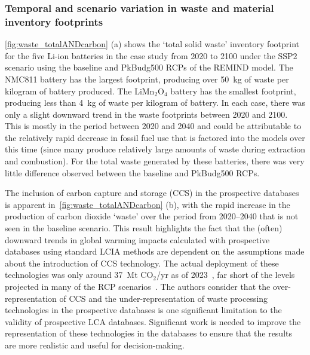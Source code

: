 \subsubsection{Temporal and scenario variation in waste and material inventory footprints}

\autoref{fig:waste_totalANDcarbon} (a) shows the `total solid waste' inventory footprint for the five Li-ion batteries in the case study from 2020 to 2100 under the SSP2 scenario using the baseline and PkBudg500 RCPs of the REMIND model. The NMC811 battery has the largest footprint, producing over 50~kg of waste per kilogram of battery produced. The  LiMn\(_2\)O\(_4\) battery has the smallest footprint, producing less than 4~kg of waste per kilogram of battery. In each case, there was only a slight downward trend in the waste footprints between 2020 and 2100. This is mostly in the period between 2020 and 2040 and could be attributable to the relatively rapid decrease in fossil fuel use that is factored into the models over this time (since many produce relatively large amounts of waste during extraction and combustion). For the total waste generated by these batteries, there was very little difference observed between the baseline and PkBudg500 RCPs.

The inclusion of carbon capture and storage (CCS) in the prospective databases is apparent in~\autoref{fig:waste_totalANDcarbon} (b), with the rapid increase in the production of carbon dioxide `waste' over the period from 2020--2040 that is not seen in the baseline scenario. This result highlights the fact that the (often) downward trends in global warming impacts calculated with prospective databases using standard LCIA methods are dependent on the assumptions made about the introduction of CCS technology. The actual deployment of these technologies was only around 37~Mt CO$_2$/yr as of 2023~\citep{dziejarski2023ccs}, far short of the levels projected in many of the RCP scenarios~\citep{sacchi2023premisedocs}. The authors consider that the over-representation of CCS and the under-representation of waste processing technologies in the prospective databases is one significant limitation to the validity of prospective LCA databases. Significant work is needed to improve the representation of these technologies in the databases to ensure that the results are more realistic and useful for decision-making.

